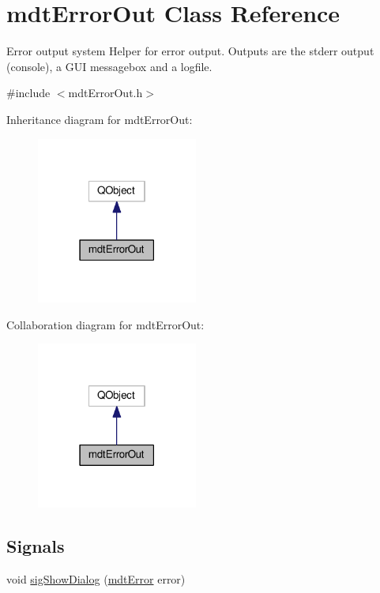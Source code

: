 \hypertarget{classmdt_error_out}{\section{mdt\-Error\-Out Class Reference}
\label{classmdt_error_out}
}


Error output system Helper for error output. Outputs are the stderr output (console), a G\-U\-I messagebox and a logfile.  




{\ttfamily \#include $<$mdt\-Error\-Out.\-h$>$}



Inheritance diagram for mdt\-Error\-Out\-:
\nopagebreak
\begin{figure}[H]
\begin{center}
\leavevmode
\includegraphics[width=150pt]{classmdt_error_out__inherit__graph}
\end{center}
\end{figure}


Collaboration diagram for mdt\-Error\-Out\-:
\nopagebreak
\begin{figure}[H]
\begin{center}
\leavevmode
\includegraphics[width=150pt]{classmdt_error_out__coll__graph}
\end{center}
\end{figure}
\subsection*{Signals}
\begin{DoxyCompactItemize}
\item 
void \hyperlink{classmdt_error_out_a033747841ec3340f0396e574723095d7}{sig\-Show\-Dialog} (\hyperlink{classmdt_error}{mdt\-Error} error)
\end{DoxyCompactItemize}
